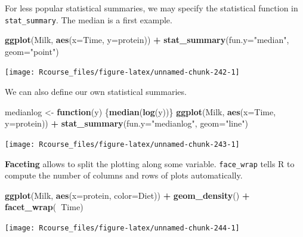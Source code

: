 \documentclass[]{book}
\newenvironment{Shaded}{\begin{snugshade}}{\end{snugshade}}
\newcommand{\KeywordTok}[1]{\textcolor[rgb]{0.13,0.29,0.53}{\textbf{#1}}}
\newcommand{\DataTypeTok}[1]{\textcolor[rgb]{0.13,0.29,0.53}{#1}}
\newcommand{\StringTok}[1]{\textcolor[rgb]{0.31,0.60,0.02}{#1}}
\newcommand{\ControlFlowTok}[1]{\textcolor[rgb]{0.13,0.29,0.53}{\textbf{#1}}}
\newcommand{\OperatorTok}[1]{\textcolor[rgb]{0.81,0.36,0.00}{\textbf{#1}}}
\newcommand{\NormalTok}[1]{#1}
\theoremstyle{definition}
\theoremstyle{definition}
\theoremstyle{definition}
\theoremstyle{remark}
\begin{document}
For less popular statistical summaries, we may specify the statistical
function in \texttt{stat\_summary}. The median is a first example.

\begin{Shaded}
\begin{Highlighting}[]
\KeywordTok{ggplot}\NormalTok{(Milk, }\KeywordTok{aes}\NormalTok{(}\DataTypeTok{x=}\NormalTok{Time, }\DataTypeTok{y=}\NormalTok{protein)) }\OperatorTok{+}
\StringTok{  }\KeywordTok{stat_summary}\NormalTok{(}\DataTypeTok{fun.y=}\StringTok{"median"}\NormalTok{, }\DataTypeTok{geom=}\StringTok{"point"}\NormalTok{)}
\end{Highlighting}
\end{Shaded}

\texttt{[image: Rcourse\_files/figure-latex/unnamed-chunk-242-1]}

We can also define our own statistical summaries.

\begin{Shaded}
\begin{Highlighting}[]
\NormalTok{medianlog <-}\StringTok{ }\ControlFlowTok{function}\NormalTok{(y) \{}\KeywordTok{median}\NormalTok{(}\KeywordTok{log}\NormalTok{(y))\}}
\KeywordTok{ggplot}\NormalTok{(Milk, }\KeywordTok{aes}\NormalTok{(}\DataTypeTok{x=}\NormalTok{Time, }\DataTypeTok{y=}\NormalTok{protein)) }\OperatorTok{+}
\StringTok{  }\KeywordTok{stat_summary}\NormalTok{(}\DataTypeTok{fun.y=}\StringTok{"medianlog"}\NormalTok{, }\DataTypeTok{geom=}\StringTok{"line"}\NormalTok{)}
\end{Highlighting}
\end{Shaded}

\texttt{[image: Rcourse\_files/figure-latex/unnamed-chunk-243-1]}

\textbf{Faceting} allows to split the plotting along some variable.
\texttt{face\_wrap} tells R to compute the number of columns and rows of
plots automatically.

\begin{Shaded}
\begin{Highlighting}[]
\KeywordTok{ggplot}\NormalTok{(Milk, }\KeywordTok{aes}\NormalTok{(}\DataTypeTok{x=}\NormalTok{protein, }\DataTypeTok{color=}\NormalTok{Diet)) }\OperatorTok{+}
\StringTok{  }\KeywordTok{geom_density}\NormalTok{() }\OperatorTok{+}
\StringTok{  }\KeywordTok{facet_wrap}\NormalTok{(}\OperatorTok{~}\NormalTok{Time)}
\end{Highlighting}
\end{Shaded}

\texttt{[image: Rcourse\_files/figure-latex/unnamed-chunk-244-1]}
\end{document}

